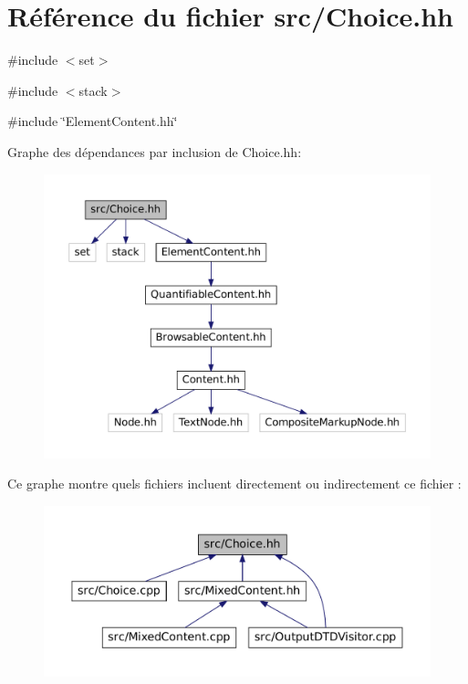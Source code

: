 \hypertarget{_choice_8hh}{
\section{Référence du fichier src/Choice.hh}
\label{_choice_8hh}
}
{\ttfamily \#include $<$set$>$}\par
{\ttfamily \#include $<$stack$>$}\par
{\ttfamily \#include \char`\"{}ElementContent.hh\char`\"{}}\par
Graphe des dépendances par inclusion de Choice.hh:\nopagebreak
\begin{figure}[H]
\begin{center}
\leavevmode
\includegraphics[width=400pt]{_choice_8hh__incl}
\end{center}
\end{figure}
Ce graphe montre quels fichiers incluent directement ou indirectement ce fichier :\nopagebreak
\begin{figure}[H]
\begin{center}
\leavevmode
\includegraphics[width=400pt]{_choice_8hh__dep__incl}
\end{center}
\end{figure}
